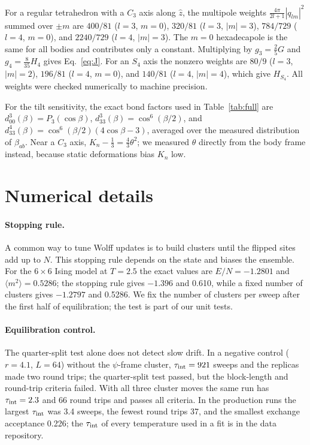 \documentclass[pre,reprint,superscriptaddress,longbibliography,amsmath,amssymb,floatfix]{revtex4-2}
\begin{document}
For a regular tetrahedron with a $C_3$ axis along $\hat z$, the multipole weights $\frac{4\pi}{2l+1}|q_{lm}|^2$ summed over $\pm m$ are $400/81$ ($l=3$, $m=0$), $320/81$ ($l=3$, $|m|=3$), $784/729$ ($l=4$, $m=0$), and $2240/729$ ($l=4$, $|m|=3$). The $m=0$ hexadecapole is the same for all bodies and contributes only a constant. Multiplying by $g_3=\frac25G$ and $g_4=\frac{8}{35}H_4$ gives Eq.~\eqref{eq:J}. For an $S_4$ axis the nonzero weights are $80/9$ ($l=3$, $|m|=2$), $196/81$ ($l=4$, $m=0$), and $140/81$ ($l=4$, $|m|=4$), which give $H_{S_4}$. All weights were checked numerically to machine precision.

For the tilt sensitivity, the exact bond factors used in Table~\ref{tab:full} are $d^3_{00}(\beta)=P_3(\cos\beta)$, $d^3_{33}(\beta)=\cos^6(\beta/2)$, and $d^4_{33}(\beta)=\cos^6(\beta/2)(4\cos\beta-3)$, averaged over the measured distribution of $\beta_{ab}$. Near a $C_3$ axis, $K_n-\frac13=\frac43\theta^2$; we measured $\theta$ directly from the body frame instead, because static deformations bias $K_n$ low.

\section{Numerical details}\label{app:numerics}

\paragraph*{Stopping rule.} A common way to tune Wolff updates is to build clusters until the flipped sites add up to $N$. This stopping rule depends on the state and biases the ensemble. For the $6\times6$ Ising model at $T=2.5$ the exact values are $E/N=-1.2801$ and $\langle m^2\rangle=0.5286$; the stopping rule gives $-1.396$ and 0.610, while a fixed number of clusters gives $-1.2797$ and 0.5286. We fix the number of clusters per sweep after the first half of equilibration; the test is part of our unit tests.

\paragraph*{Equilibration control.} The quarter-split test alone does not detect slow drift. In a negative control ($r=4.1$, $L=64$) without the $\psi$-frame cluster, $\tau_{\rm int}=921$ sweeps and the replicas made two round trips; the quarter-split test passed, but the block-length and round-trip criteria failed. With all three cluster moves the same run has $\tau_{\rm int}=2.3$ and 66 round trips and passes all criteria. In the production runs the largest $\tau_{\rm int}$ was 3.4 sweeps, the fewest round trips 37, and the smallest exchange acceptance 0.226; the $\tau_{\rm int}$ of every temperature used in a fit is in the data repository.
\end{document}
